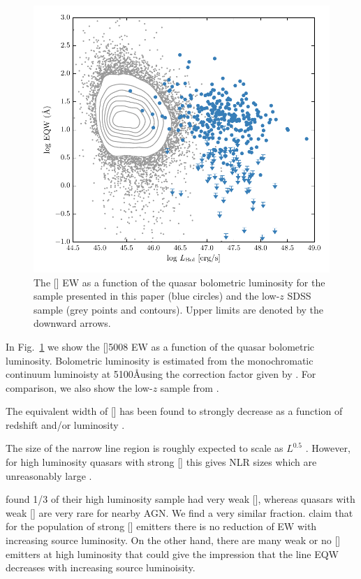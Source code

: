 \begin{figure}
    \includegraphics[width=\columnwidth]{figures/chapter04/eqw_lum.pdf} 
    \caption{The [] EW as a function of the quasar bolometric luminosity for the sample presented in this paper (blue circles) and the low-$z$ SDSS sample (grey points and contours). Upper limits are denoted by the downward arrows.}     
    \label{fig:eqw_lum}
\end{figure}

In Fig.~\ref{fig:eqw_lum} we show the []5008 EW as a function of the quasar bolometric luminosity. 
Bolometric luminosity is estimated from the monochromatic continuum luminoisty at 5100\AA using the correction factor given by \citet{richards06}. 
For comparison, we also show the low-$z$ sample from \citet{shen11}.  

The equivalent width of [] has been found to strongly decrease as a function of redshift and/or luminosity \citep[e.g.][]{brotherton96,netzer04,sulentic04,baskin05b}. 

The size of the narrow line region is roughly expected to scale as $L^{0.5}$ \citep[e.g.][]{netzer04}. 
However, for high luminosity quasars with strong [] this gives NLR sizes which are unreasonably large \citep[$\sim$100 kpc;][]{netzer04}. 

\citet{netzer04} found 1/3 of their high luminosity sample had very weak [], whereas quasars with weak [] are very rare for nearby AGN. 
We find a very similar fraction. 
\citet{netzer04} claim that for the population of strong [] emitters there is no reduction of EW with increasing source luminosity. 
On the other hand, there are many weak or no [] emitters at high luminosity that could give the impression that the line EQW decreases with increasing source luminoisity. 

